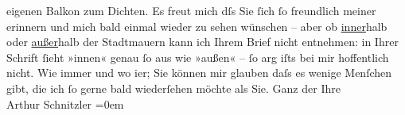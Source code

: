 \begin{ledgroupsized}[t]{13cm}
                    eigenen {\pb}Balkon zum Dichten.\pend
           \pstart
           Es freut mich dſs Sie ſich ſo freundlich meiner erinnern und mich bald einmal
                    wieder zu sehen wünschen – aber ob \uline{inner}halb
                    oder \uline{außer}halb der Stadtmauern kann ich Ihrem
                    Brief nicht entnehmen: in Ihrer Schrift ſieht {\pb}»innen«
                    genau ſo aus wie »außen« – ſo arg iſts bei mir hoffentlich nicht.\pend
           \pstart
           Wie immer und wo i{\geminationm}er; Sie können mir glauben daſs
                    es wenige Menſchen gibt, die ich ſo gerne bald wiederſehen möchte als Sie.\pend
           \pstart
           Ganz der Ihre{\\[\baselineskip]}Arthur Schnitzler\pend
           \leftskip=0em{}\endnumbering{}\end{ledgroupsized}  \newcommand{\dateiname}{L00964}\newcommand{\titel}{Arthur Schnitzler an Gerhart Hauptmann, 25. 8. 1899}\newcommand{\editorInnen}{ Martin Anton Müller und Gerd-Hermann Susen}
      
